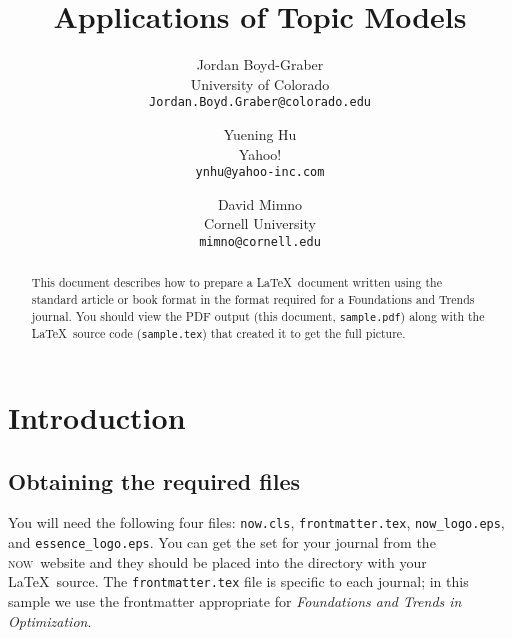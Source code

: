 \documentclass[openany]{now} %
\title{Applications of Topic Models}
\author{
Jordan Boyd-Graber \\
University of Colorado \\
\texttt{Jordan.Boyd.Graber@colorado.edu}
\and
Yuening Hu \\
Yahoo! \\
\texttt{ynhu@yahoo-inc.com}
\and
David Mimno \\
Cornell University \\
\texttt{mimno@cornell.edu}
}
\newcommand{\now}{\textsc{now}}
\begin{document}
\copyrightowner{}

\frontmatter  %

\maketitle

\tableofcontents

\mainmatter

\begin{abstract}
This document describes how to prepare a \LaTeX\ document written using the
standard article or book format in the format required for a Foundations and
Trends\textsuperscript{\textregistered}  journal.  You should view the PDF
output (this document, \texttt{sample.pdf}) along with the \LaTeX\ source code
(\texttt{sample.tex}) that created it to get the full picture.
\end{abstract}










\chapter{Introduction}
\label{c-intro} %

\section{Obtaining the required files}
\label{s-files} %

You will need the following four files: 
\texttt{now.cls}, 
\texttt{frontmatter.tex},
\texttt{now\_logo.eps}, and 
\texttt{essence\_logo.eps}.
You can get the set for your journal from the \now\ website and they
should be placed into the directory with your \LaTeX\ source. The
\texttt{frontmatter.tex} file is specific to each journal; in this sample we
use the frontmatter appropriate for \emph{Foundations and
Trends\textsuperscript{\textregistered}  in Optimization}.

\iffalse
\end{document}
